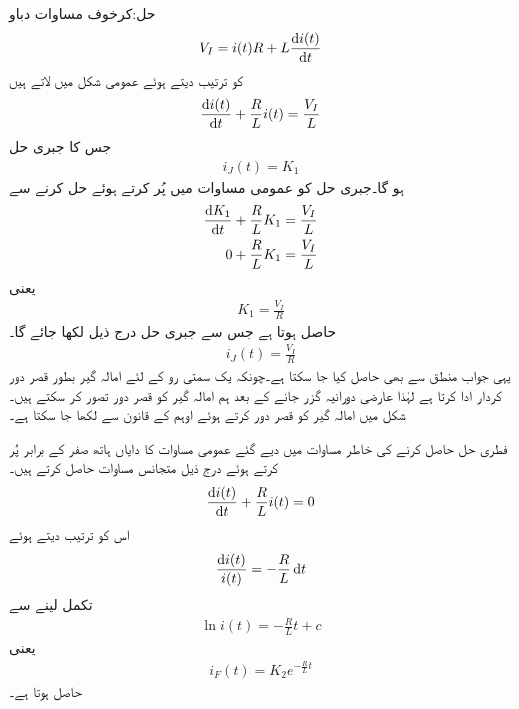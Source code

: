 حل:کرخوف مساوات دباو
\begin{align*}
V_I=i(t)R+L\frac{\dif i(t)}{\dif t}
\end{align*}
کو ترتیب دیتے ہوئے عمومی شکل میں لاتے ہیں
\begin{align}\label{مساوات_عارضی_امالہ_گیر_عمومی_الف}
\frac{\dif i(t)}{\dif t}+\frac{R}{L} i(t)=\frac{V_I}{L}
\end{align}
جس کا جبری حل
\begin{align*}
i_J(t)=K_1
\end{align*}
ہو گا۔جبری حل کو عمومی مساوات میں پُر کرتے ہوئے حل کرنے سے
\begin{align*}
\frac{\dif K_1}{\dif t}+\frac{R}{L} K_1&=\frac{V_I}{L}\\
0+\frac{R}{L} K_1&=\frac{V_I}{L}
\end{align*}
یعنی
\begin{align*}
K_1=\frac{V_I}{R}
\end{align*}
حاصل ہوتا ہے جس سے جبری حل درج ذیل لکھا جائے گا۔
\begin{align*}
i_J(t)=\frac{V_I}{R}
\end{align*}
یہی جواب منطق سے بھی حاصل کیا جا سکتا ہے۔چونکہ  یک سمتی رو کے لئے امالہ گیر بطور قصر دور کردار ادا کرتا ہے لہٰذا عارضی دورانیہ گزر جانے کے بعد ہم امالہ گیر کو قصر دور تصور کر سکتے ہیں۔شکل  میں امالہ گیر کو قصر دور کرتے ہوئے اوہم کے قانون سے  لکھا جا سکتا ہے۔

فطری حل حاصل کرنے کی خاطر مساوات  میں دیے گئے عمومی مساوات کا دایاں ہاتھ صفر کے برابر پُر کرتے ہوئے درج ذیل متجانس مساوات حاصل کرتے ہیں۔
\begin{align*}
\frac{\dif i(t)}{\dif t}+\frac{R}{L} i(t)=0
\end{align*}
اس کو ترتیب دیتے ہوئے
\begin{align*}
\frac{\dif i(t)}{i(t)}=-\frac{R}{L} \dif t
\end{align*}
تکمل لینے سے
\begin{align*}
\ln i(t)=-\frac{R}{L}t +c
\end{align*}
یعنی
\begin{align*}
i_F(t)=K_2e^{-\frac{R}{L}t}
\end{align*}
حاصل ہوتا ہے۔

